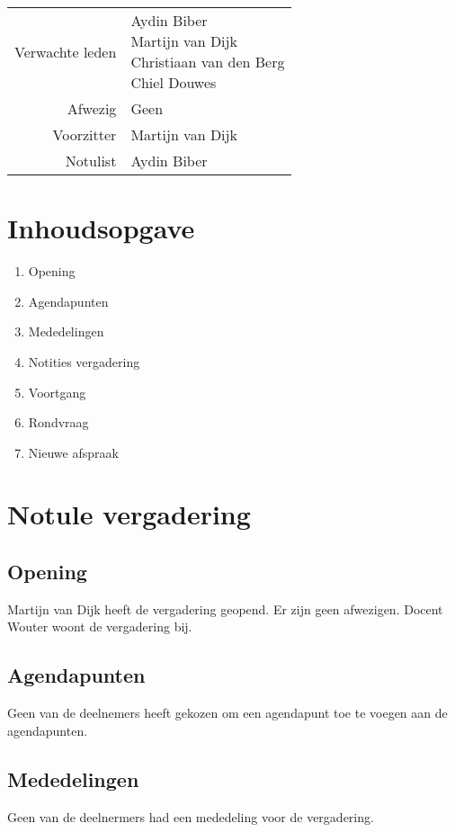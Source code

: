 \documentclass[dutch]{hu}
\date{9 december 2015}
\subtitle{Notulen 09-12-2015}
\begin{document}
\maketitle
\pagestyle{plain}

\begin{tabular}{ r | l }
Verwachte leden & \makecell[l]{
	Aydin Biber \\
	Martijn van Dijk \\
	Christiaan van den Berg \\
	Chiel Douwes
	} \\
Afwezig & Geen \\
Voorzitter & Martijn van Dijk \\
Notulist & Aydin Biber \\
\end{tabular}

\chapter{Inhoudsopgave}
\begin{enumerate}
\item Opening
\item Agendapunten
\item Mededelingen
\item Notities vergadering
\item Voortgang
\item Rondvraag
\item Nieuwe afspraak
\end{enumerate}

\chapter{Notule vergadering}
\section{Opening}
Martijn van Dijk heeft de vergadering geopend. Er zijn geen afwezigen.
Docent Wouter woont de vergadering bij.

\section{Agendapunten}
Geen van de deelnemers heeft gekozen om een agendapunt toe te voegen aan de agendapunten.

\section{Mededelingen}
Geen van de deelnermers had een mededeling voor de vergadering.
\end{document}
